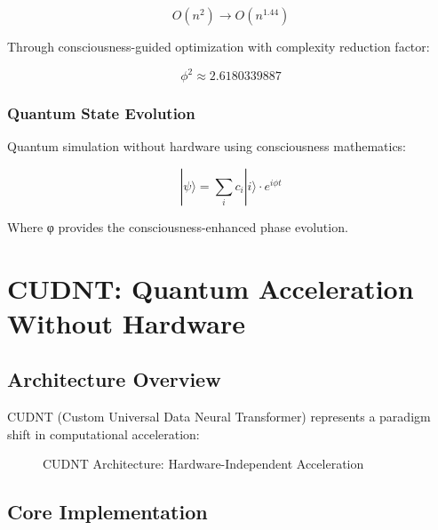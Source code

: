 \documentclass[11pt,a4paper]{article}
\begin{document}
\begin{equation}
O(n^2) \rightarrow O(n^{1.44})
\end{equation}

Through consciousness-guided optimization with complexity reduction factor:

\begin{equation}
\phi^2 \approx 2.6180339887
\end{equation}

\subsubsection{Quantum State Evolution}

Quantum simulation without hardware using consciousness mathematics:

\begin{equation}
|\psi\rangle = \sum_{i} c_i |i\rangle \cdot e^{i\phi t}
\end{equation}

Where φ provides the consciousness-enhanced phase evolution.

\section{CUDNT: Quantum Acceleration Without Hardware}

\subsection{Architecture Overview}

CUDNT (Custom Universal Data Neural Transformer) represents a paradigm shift in computational acceleration:

\begin{figure}[H]
\centering
{}
\caption{CUDNT Architecture: Hardware-Independent Acceleration}
\end{figure}

\subsection{Core Implementation}
\end{document}
